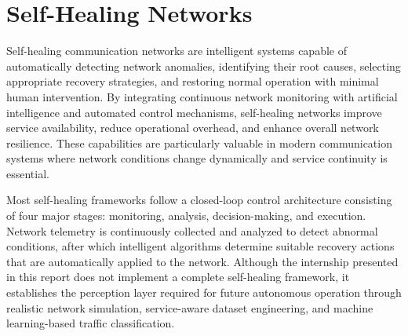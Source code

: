 \documentclass[12pt,a4paper]{report}
\begin{document}
	\section{Self-Healing Networks}
	\label{sec:self_healing}
	
	Self-healing communication networks are intelligent systems capable of automatically detecting network anomalies, identifying their root causes, selecting appropriate recovery strategies, and restoring normal operation with minimal human intervention. By integrating continuous network monitoring with artificial intelligence and automated control mechanisms, self-healing networks improve service availability, reduce operational overhead, and enhance overall network resilience. These capabilities are particularly valuable in modern communication systems where network conditions change dynamically and service continuity is essential.
	
	Most self-healing frameworks follow a closed-loop control architecture consisting of four major stages: monitoring, analysis, decision-making, and execution. Network telemetry is continuously collected and analyzed to detect abnormal conditions, after which intelligent algorithms determine suitable recovery actions that are automatically applied to the network. Although the internship presented in this report does not implement a complete self-healing framework, it establishes the perception layer required for future autonomous operation through realistic network simulation, service-aware dataset engineering, and machine learning-based traffic classification.

	
\end{document}
